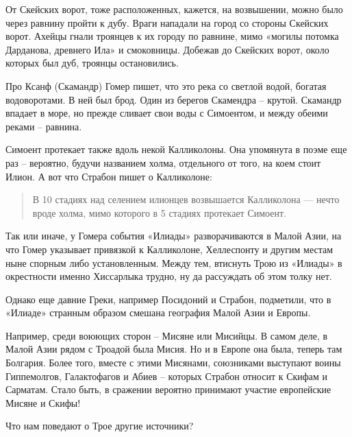 От Скейских ворот, тоже расположенных, кажется, на возвышении, можно было через равнину пройти к дубу. Враги нападали на город со стороны Скейских ворот. Ахейцы гнали троянцев к их городу по равнине, мимо «могилы потомка Дарданова, древнего Ила» и смоковницы. Добежав до Скейских ворот, около которых был дуб, троянцы остановились. 

Про Ксанф (Скамандр) Гомер пишет, что это река со светлой водой, богатая водоворотами. В ней был брод. Один из берегов Скамендра – крутой. Скамандр впадает в море, но прежде сливает свои воды с Симоентом, и между обеими реками – равнина.

Симоент протекает также вдоль некой Калликолоны. Она упомянута в поэме еще раз – вероятно, будучи названием холма, отдельного от того, на коем стоит Илион. А вот что Страбон пишет о Калликолоне:

\begin{quotation} 
В 10 стадиях над селением илионцев возвышается Калликолона — нечто вроде холма, мимо которого в 5 стадиях протекает Симоент.
\end{quotation}

Так или иначе, у Гомера события «Илиады» разворачиваются в Малой Азии, на что Гомер указывает привязкой к Калликолоне, Хеллеспонту и другим местам ныне спорным либо установленным. Между тем, втиснуть Трою из «Илиады» в окрестности именно Хиссарлыка трудно, ну да рассуждать об этом толку нет.

Однако еще давние Греки, например Посидоний и Страбон, подметили, что в «Илиаде» странным образом смешана география Малой Азии и Европы.

Например, среди воюющих сторон – Мисяне или Мисийцы. В самом деле, в Малой Азии рядом с Троадой была Мисия. Но и в Европе она была, теперь там Болгария. Более того, вместе с этими Мисянами, союзниками выступают воины Гиппемолгов, Галактофагов и Абиев – которых Страбон относит к Скифам и Сарматам. Стало быть, в сражении вероятно принимают участие европейские Мисяне и Скифы!

Что нам поведают о Трое другие источники?
